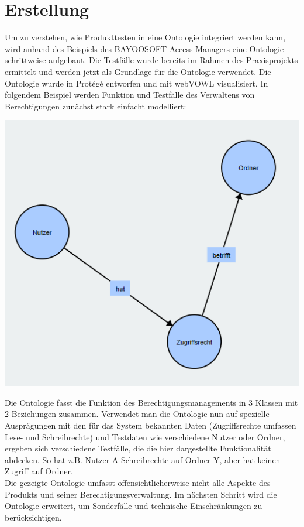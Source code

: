 \section{Erstellung}
Um zu verstehen, wie Produkttesten in eine Ontologie integriert werden kann, wird anhand des Beispiels des BAYOOSOFT Access Managers eine Ontologie schrittweise aufgebaut. Die Testfälle wurde bereits im Rahmen des Praxisprojekts ermittelt und werden jetzt als Grundlage für die Ontologie verwendet. Die Ontologie wurde in Protégé entworfen und mit webVOWL visualisiert. \newline
In folgendem Beispiel werden Funktion und Testfälle des Verwaltens von Berechtigungen zunächst stark einfacht modelliert:\\

\begin{center}
    \includegraphics[width=1\textwidth]{Thesis/Images/OntologySmall.png}        
\end{center}

Die Ontologie fasst die Funktion des Berechtigungsmanagements in 3 Klassen mit 2 Beziehungen zusammen. 
Verwendet man die Ontologie nun auf spezielle Ausprägungen mit den für das System bekannten Daten (Zugriffsrechte umfassen Lese- und Schreibrechte) und Testdaten wie verschiedene Nutzer oder Ordner, ergeben sich verschiedene Testfälle, die die hier dargestellte Funktionalität abdecken. So hat z.B. Nutzer A Schreibrechte auf Ordner Y, aber hat keinen Zugriff auf Ordner. \\
Die gezeigte Ontologie umfasst offensichtlicherweise nicht alle Aspekte des Produkts und seiner Berechtigungsverwaltung. Im nächsten Schritt wird die Ontologie erweitert, um Sonderfälle und technische Einschränkungen zu berücksichtigen.\\

